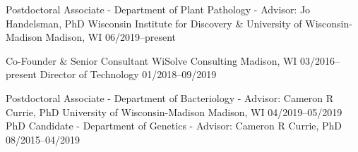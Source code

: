 

\begin{cventries}

\cventry
{Postdoctoral Associate - Department of Plant Pathology - Advisor: Jo Handelsman, PhD}
{Wisconsin Institute for Discovery \& University of Wisconsin-Madison}
{Madison, WI}
{06/2019--present}
{
}

\vspace{-0.4cm}

\cventry
{Co-Founder \& Senior Consultant}
{WiSolve Consulting}
{Madison, WI}
{03/2016--present}
{}
\vspace{-0.4cm}
\cventry
{Director of Technology}
{}
{}
{01/2018--09/2019}
{
}

\vspace{-0.4cm}
  
\cventry
{Postdoctoral Associate - Department of Bacteriology - Advisor: Cameron R Currie, PhD}
{University of Wisconsin-Madison}
{Madison, WI}
{04/2019--05/2019}
{}
\vspace{-0.4cm}
\cventry
{PhD Candidate - Department of Genetics - Advisor: Cameron R Currie, PhD}
{}
{}
{08/2015--04/2019}
{
}


\end{cventries}
